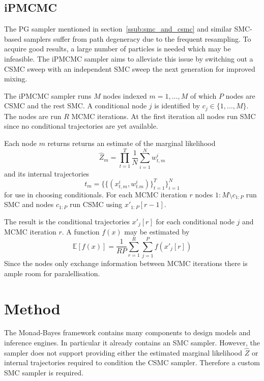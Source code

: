 \subsection{iPMCMC}

The PG sampler mentioned in section~\ref{ssub:smc_and_csmc} and similar SMC-based samplers suffer from path degeneracy due to the frequent resampling. To acquire good results, a large number of particles is needed which may be infeasible. The iPMCMC sampler aims to alleviate this issue by switching out a CSMC sweep with an independent SMC sweep the next generation for improved mixing.

The iPMCMC sampler runs $M$ nodes indexed $m = 1,\dots,M$ of which $P$ nodes are CSMC and the rest SMC. A conditional node $j$ is identified by $c_j \in \{1,\dots,M\}$. The nodes are run $R$ MCMC iterations. At the first iteration all nodes run SMC since no conditional trajectories are yet available.

Each node $m$ returns returns an estimate of the marginal likelihood
\begin{equation}
    \label{eq:zm}
    \hat Z_m = \prod\limits_{t=1}^T \frac 1 N \sum\limits_{i=1}^N w_{t,m}^i
\end{equation} and its internal trajectories
\begin{equation}
t_m = \{\{(x^i_{t,m},w^i_{t.m})\}_{t=1}^T\}_{i=1}^N
\end{equation}
for use in choosing conditionals. For each MCMC iteration $r$ nodes $1:M \setminus c_{1:P}$ run SMC and nodes $c_{1:P}$ run CSMC using $x'_{1:P}[r-1]$. 

The result is the conditional trajectories $x'_j[r]$ for each conditional node $j$ and MCMC iteration $r$. A function $f(x)$ may be estimated by
\begin{equation}
    \mathbb{E}[f(x)] = \frac 1 {RP} \sum\limits_{r=1}^R \sum\limits_{j=1}^P f(x'_j[r])
\end{equation}
Since the nodes only exchange information between MCMC iterations there is ample room for paralellisation.

\section{Method}

The Monad-Bayes framework contains many components to design models and inference engines.
In particular it already contains an SMC sampler.
However, the sampler does not support providing either the estimated marginal likelihood $\hat Z$ or internal trajectories required to condition the CSMC sampler.
Therefore a custom SMC sampler is required.

